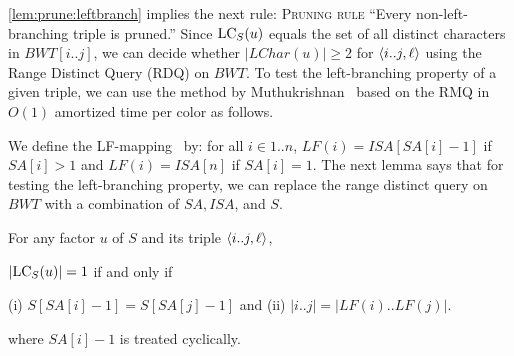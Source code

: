 \cref{lem:prune:leftbranch} implies the next rule: \textsc{Pruning rule} ``{Every non-left-branching triple is pruned.}''
Since $\mathrm{LC}_{S}(u)$ equals the set of all distinct characters in $BWT[i..j]$, we can decide whether $|LChar(u)| \ge 2$ for $\langle i..j, \ell\rangle$ using the Range Distinct Query (RDQ) on $BWT$.
To test the left-branching property of a given triple, we can use 
the method by Muthukrishnan~\cite{muthukrishnan2002efficient} based on the RMQ in $O(1)$ amortized time per color as follows. 

We define the LF-mapping~\cite{Ferragina05:FM} by: for all $i \in 1..n$,
$LF(i) = ISA[SA[i]-1]$ if $SA[i] > 1$ and $LF(i) = ISA[n]$ if $SA[i]=1$. 
The next lemma says that for testing the left-branching property, we can replace the range distinct query on $BWT$ with a combination of $SA, ISA$, and $S$. 

\begin{lemmarep}
\label{lem:leftmaximal:character}
For any factor $u$ of $S$ and its triple $\langle i..j, \ell\rangle$, 
\begin{enumerate*}[(a)]
\item $|\mathrm{LC}_{S}(u)| = 1$ if and only if 
\item (i) $S[SA[i]-1] = S[SA[j]-1]$ and (ii) $|i..j| = |LF(i)..LF(j)|$.
\end{enumerate*}
where $SA[i]-1$ is treated cyclically. 
\end{lemmarep}

